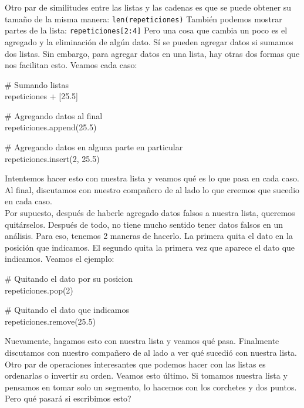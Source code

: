 \documentclass[10pt,letterpaper]{article}
\newcommand{\inlinecode}[1]{
\colorbox{light-gray}{\texttt{#1}}
}
\newenvironment{Code}
{
\begin{lrbox}{\selvestebox}%
\begin{minipage}{\dimexpr\columnwidth-2\fboxsep\relax}
\fontfamily{\ttdefault}\selectfont
}
{\end{minipage}\end{lrbox}%
\begin{center}
\colorbox{light-gray}{\usebox{\selvestebox}}
\end{center}
}
\begin{document}
Otro par de similitudes entre las listas y las cadenas es que se puede obtener su tama\~no de la misma manera: \inlinecode{len(repeticiones)} Tambi\'en podemos mostrar partes de la lista: \inlinecode{repeticiones[2:4]} Pero una cosa que cambia un poco es el agregado y la eliminaci\'on de alg\'un dato. S\'i se pueden agregar datos si sumamos dos listas. Sin embargo, para agregar datos en una lista, hay otras dos formas que nos facilitan esto. Veamos cada caso:

\begin{Code}
\# Sumando listas\\
repeticiones + [25.5]

\# Agregando datos al final\\
repeticiones.append(25.5)

\# Agregando datos en alguna parte en particular\\
repeticiones.insert(2, 25.5)
\end{Code}

Intentemos hacer esto con nuestra lista y veamos qu\'e es lo que pasa en cada caso. Al final, discutamos con nuestro compa\~nero de al lado lo que creemos que sucedio en cada caso.\\

Por supuesto, despu\'es de haberle agregado datos falsos a nuestra lista, queremos quit\'arselos. Despu\'es de todo, no tiene mucho sentido tener datos falsos en un an\'alisis. Para eso, tenemos 2 maneras de hacerlo. La primera quita el dato en la posici\'on que indicamos. El segundo quita la primera vez que aparece el dato que indicamos. Veamos el ejemplo:

\begin{Code}
\# Quitando el dato por su posicion\\
repeticiones.pop(2)

\# Quitando el dato que indicamos\\
repeticiones.remove(25.5)
\end{Code}

Nuevamente, hagamos esto con nuestra lista y veamos qu\'e pasa. Finalmente discutamos con nuestro compa\~nero de al lado a ver qu\'e sucedi\'o con nuestra lista.\\

Otro par de operaciones interesantes que podemos hacer con las listas es ordenarlas o invertir su orden. Veamos esto \'ultimo. Si tomamos nuestra lista y pensamos en tomar solo un segmento, lo hacemos con los corchetes y dos puntos. Pero qu\'e pasar\'a si escribimos esto?
\end{document}
